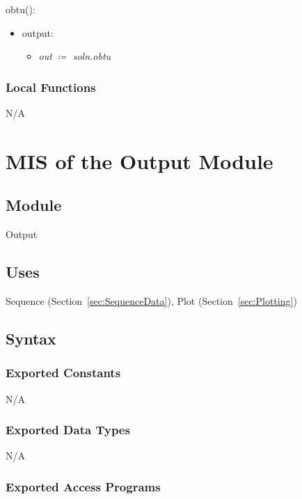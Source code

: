 \documentclass[12pt, titlepage]{article}
\begin{document}
\noindent obtu():
\begin{itemize}
	\item output:
	\begin{itemize}
		\item[] \textit{out} $\coloneqq$ \textit{soln.obtu}\\
	\end{itemize}
\end{itemize}

\subsubsection{Local Functions}

N/A


\section{MIS of the Output Module} \label{sec:OutputMod}

\subsection{Module}
Output

\subsection{Uses}

Sequence (Section~\ref{sec:SequenceData}), Plot (Section~\ref{sec:Plotting})

\subsection{Syntax}

\subsubsection{Exported Constants}
N/A

\subsubsection{Exported Data Types}
N/A

\subsubsection{Exported Access Programs}
\end{document}
